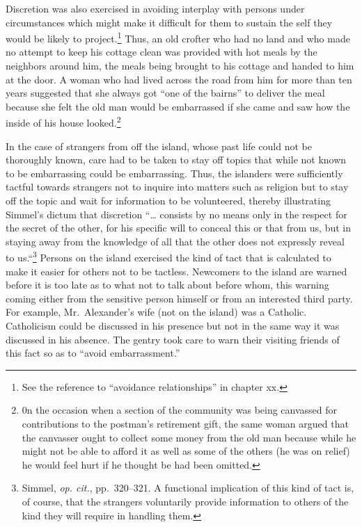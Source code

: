 \documentclass[twoside,symmetric,nobib,justified]{tufte-book}
\begin{document}
Discretion was also exercised in avoiding interplay with persons under
circumstances which might make it difficult for them to sustain the self
they would be likely to project.\footnote{See the reference to
  ``avoidance relationships'' in chapter xx.} Thus, an old crofter who
had no land and who made no attempt to keep his cottage clean was
provided with hot meals by the neighbors around him, the meals being
brought to his cottage and handed to him at the door. A woman who had
lived across the road from him for more than ten years suggested that
she always got ``one of the bairns'' to deliver the meal because she
felt the old man would be embarrassed if she came and saw how the inside
of his house looked.\footnote{0n the occasion when a section of the
  community was being canvassed for contributions to the postman's
  retirement gift, the same woman argued that the canvasser ought to
  collect some money from the old man because while he might not be able
  to afford it as well as some of the others (he was on relief) he would
  feel hurt if he thought be had been omitted.}

In the case of strangers from off the island, whose past life could not
be thoroughly known, care had to be taken to stay off topics that while
not known to be embarrassing could be embarrassing. Thus, the islanders
were sufficiently tactful towards strangers not to inquire into matters
such as religion but to stay off the topic and wait for information to
be volunteered, thereby illustrating Simmel's dictum that discretion
``\ldots{} consists by no means only in the respect for the secret of
the other, for his specific will to conceal this or that from us, but in
staying away from the knowledge of all that the other does not expressly
reveal to us.``\footnote{Simmel, \emph{op. cit.}, pp.~320--321. A
  functional implication of this kind of tact is, of course, that the
  strangers voluntarily provide information to others of the kind they
  will require in handling them.} Persons on the island exercised the
kind of tact that is calculated to make it easier for others not to be
tactless. Newcomers to the island are warned before it is too late as to
what not to talk about before whom, this warning coming either from the
sensitive person himself or from an interested third party. For example,
Mr.~Alexander's wife (not on the island) was a Catholic. Catholicism
could be discussed in his presence but not in the same way it was
discussed in his absence. The gentry took care to warn their visiting
friends of this fact so as to ``avoid embarrassment.''
\end{document}
